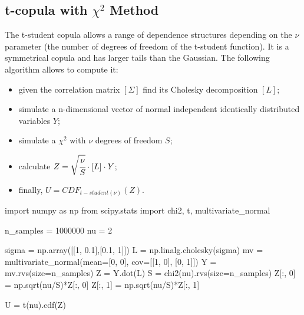 \subsection{t-copula with $\chi^2$ Method}
\label{sec:t-student_copula}
The t-student copula allows a range of dependence structures depending
on the $\nu$ parameter (the number of degrees of freedom of the t-student function).
It is a symmetrical copula and has larger tails than the Gaussian. The following algorithm allows to compute it:
\begin{itemize}
\item given the correlation matrix $[\Sigma]$ find its Cholesky decomposition $[L]$;
\item simulate a n-dimensional vector of normal independent identically distributed variables $Y$;
\item simulate a $\chi^2$ with $\nu$ degrees of freedom $S$;
\item calculate $Z = \sqrt{\cfrac{\nu}{S}}\cdot [L] \cdot Y$;
\item finally, $U = CDF_{t-student(\nu)}(Z)$.
\end{itemize}

\begin{ipython}
import numpy as np
from scipy.stats import chi2, t, multivariate_normal

n_samples = 1000000
nu = 2

sigma = np.array([[1, 0.1],[0.1, 1]])
L = np.linalg.cholesky(sigma)
mv = multivariate_normal(mean=[0, 0], cov=[[1, 0], [0, 1]])
Y = mv.rvs(size=n_samples)
Z = Y.dot(L)
S = chi2(nu).rvs(size=n_samples)
Z[:, 0] = np.sqrt(nu/S)*Z[:, 0]
Z[:, 1] = np.sqrt(nu/S)*Z[:, 1]

U = t(nu).cdf(Z)
\end{ipython}

